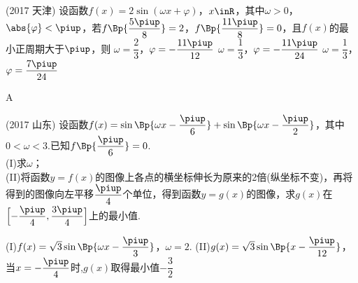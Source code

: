 \begin{exercise}
        \vspace{-0.9cm}
      \item%
            {\kaishu (2017 \textbullet 天津)}
            设函数$f(x)=2\sin(\omega x+\varphi)$，$x\inR$，其中$\omega>0$，$\abs{\varphi}<\piup$，若$f\Bp{\dfrac{5\piup}8}=2$，$f\Bp{\dfrac{11\piup}8}=0$，且$f(x)$的最小正周期大于$\piup$，则\xz
             {$\omega=\dfrac23$，$\varphi=-\dfrac{11\piup}{12}$}
             {$\omega=\dfrac13$，$\varphi=-\dfrac{11\piup}{24}$}
             {$\omega=\dfrac13$，$\varphi=\dfrac{7\piup}{24}$}
            \begin{answer}
              A
            \end{answer}
      \newpage
      \item%
            {\kaishu (2017 \textbullet 山东)}
            设函数$f(x)=\sin\Bp{\omega x-\dfrac{\piup}6}+\sin\Bp{\omega x-\dfrac{\piup}2}$，其中$0<\omega<3$.已知$f\Bp{\dfrac{\piup}6}=0$.\\
            (I)求$\omega$；\\
            (II)将函数$y=f(x)$的图像上各点的横坐标伸长为原来的2倍(纵坐标不变)，再将得到的图像向左平移$\dfrac{\piup}4$个单位，得到函数$y=g(x)$的图像，求$g(x)$在$\Bigl[-\dfrac{\piup}4,\dfrac{3\piup}4\Bigr]$上的最小值.
            \begin{answer}
              (I)$f(x)=\sqrt3\sin\Bp{\omega x-\dfrac{\piup}3}$，$\omega=2$.
              (II)$g(x)=\sqrt3\sin\Bp{x-\dfrac{\piup}{12}}$，当$x=-\dfrac{\piup}4$时,$g(x)$取得最小值$-\dfrac32$
            \end{answer}
      \vspace{5cm}
    \end{exercise}

